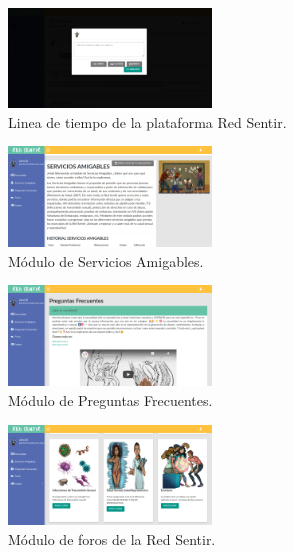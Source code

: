 \documentclass[journal,transmag]{IEEEtran}
\begin{document}
\begin{figure}[tbp]
\centering
\includegraphics[width=0.48\textwidth]{novedades.png}
\caption{Linea de tiempo de la plataforma Red Sentir.}
\label{fig:novedades}
\end{figure}

\begin{figure}[tbp]
\centering
\includegraphics[width=0.48\textwidth]{SA.png}
\caption{Módulo de Servicios Amigables.}
\label{fig:SA}
\end{figure}

\begin{figure}[tbp]
\centering
\includegraphics[width=0.48\textwidth]{FAQ.png}
\caption{Módulo de Preguntas Frecuentes.}
\label{fig:FAQ}
\end{figure}

\begin{figure}[tbp]
\centering
\includegraphics[width=0.48\textwidth]{foros.png}
\caption{Módulo de foros de la Red Sentir.}
\label{fig:foros}
\end{figure}
\end{document}
